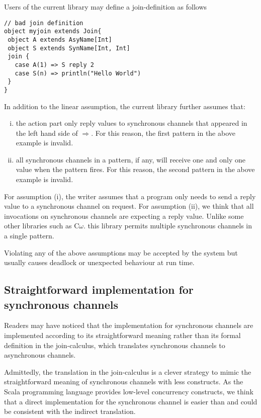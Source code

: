 Users of the current library may define a join-definition as follows
\begin{lstlisting}
// bad join definition
object myjoin extends Join{
 object A extends AsyName[Int]
 object S extends SynName[Int, Int]
 join {
   case A(1) => S reply 2
   case S(n) => println("Hello World")
 }
}
\end{lstlisting}

In addition to the linear assumption, the current library further assumes that:
\begin{enumerate}[(i)]
  \item  the action part only reply values to synchronous channels that appeared in the left hand side of $\Rightarrow$.   For this reason, the first pattern in the above example is invalid.
  \item all synchronous channels in a pattern, if any, will receive one and only one value when the pattern fires.  For this reason, the second pattern in the above example is invalid.
\end{enumerate}

For assumption (i), the writer assumes that a program only needs to send a reply value to a synchronous channel on request.  For assumption (ii), we think that all invocations on synchronous channels are expecting a reply value.  Unlike some other libraries such as C$\omega$. this library permits multiple synchronous channels in a single pattern.  

Violating any of the above assumptions may be accepted by the system but usually causes deadlock or unexpected behaviour at run time.

\subsection{Straightforward implementation for synchronous channels}
Readers may have noticed that the implementation for synchronous channels are implemented according to its straightforward meaning rather than its formal definition in the join-calculus, which translates synchronous channels to asynchronous channels.

Admittedly, the translation in the join-calculus is a clever strategy to mimic the straightforward meaning of synchronous channels with less constructs.  As the Scala programming language provides low-level concurrency constructs, we think that a direct implementation for the synchronous channel is easier than and could be consistent with the indirect translation.

